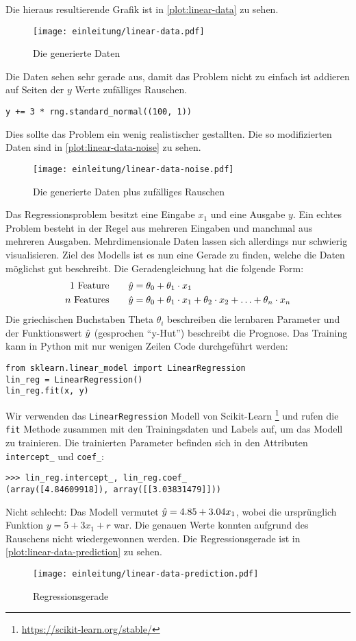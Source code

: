 Die hieraus resultierende Grafik ist in \autoref{plot:linear-data} zu sehen.
\newpage
\begin{figure}
  \centering
  \texttt{[image: einleitung/linear-data.pdf]}
  \caption{Die generierte Daten}
  \label{plot:linear-data}
\end{figure}
\noindent
Die Daten sehen sehr gerade aus, damit das Problem nicht zu einfach ist
addieren auf Seiten der $y$ Werte zufälliges Rauschen.
\begin{lstlisting}
y += 3 * rng.standard_normal((100, 1))
\end{lstlisting}
Dies sollte das Problem ein wenig realistischer gestallten.
Die so modifizierten Daten sind in \autoref{plot:linear-data-noise} zu sehen.
\begin{figure}[h]
  \centering
  \texttt{[image: einleitung/linear-data-noise.pdf]}
  \caption{Die generierte Daten plus zufälliges Rauschen}
  \label{plot:linear-data-noise}
\end{figure}
Das Regressionsproblem besitzt eine Eingabe $x_1$ und eine Ausgabe $y$.
Ein echtes Problem besteht in der Regel aus mehreren Eingaben und manchmal
aus mehreren Ausgaben. Mehrdimensionale Daten lassen sich allerdings nur schwierig
visualisieren. Ziel des Modells ist es nun eine Gerade zu finden, welche die
Daten möglichst gut beschreibt. Die Geradengleichung hat die folgende Form:
\begin{align}
  \text{1 Feature}\qquad    & \hat{y} = \theta_0 + \theta_1 \cdot x_1   \\
  \text{$n$ Features}\qquad & \hat{y} = \theta_0 + \theta_1 \cdot x_1 +
  \theta_2 \cdot x_2 + \ldots + \theta_n \cdot x_n
\end{align}
Die griechischen Buchstaben Theta $\theta_i$ beschreiben die lernbaren Parameter und
der Funktionswert $\hat{y}$ (gesprochen \enquote{y-Hut}) beschreibt die Prognose.
Das Training kann in Python mit nur wenigen Zeilen Code durchgeführt werden:
\begin{lstlisting}
from sklearn.linear_model import LinearRegression
lin_reg = LinearRegression()
lin_reg.fit(x, y)
\end{lstlisting}
Wir verwenden das \lstinline{LinearRegression} Modell von Scikit-Learn
\footnote{\url{https://scikit-learn.org/stable/}} und rufen die \lstinline{fit}
Methode zusammen mit den Trainingsdaten und Labels auf, um das Modell zu trainieren.
Die trainierten Parameter befinden sich in den Attributen \lstinline{intercept_}
und \lstinline{coef_}:
\begin{lstlisting}
>>> lin_reg.intercept_, lin_reg.coef_
(array([4.84609918]), array([[3.03831479]]))
\end{lstlisting}
Nicht schlecht: Das Modell vermutet $\hat{y} = 4.85 + 3.04x_1$, wobei die ursprünglich
Funktion $y = 5 + 3x_1 + r$ war. Die genauen Werte konnten aufgrund des Rauschens
nicht wiedergewonnen werden. Die Regressionsgerade ist
in \autoref{plot:linear-data-prediction} zu sehen.
\begin{figure}[!h]
  \centering
  \texttt{[image: einleitung/linear-data-prediction.pdf]}
  \caption{Regressionsgerade}
  \label{plot:linear-data-prediction}
\end{figure}

